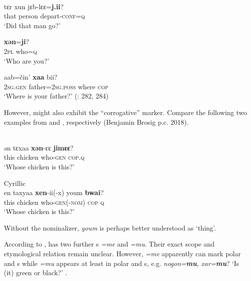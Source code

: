 \ea%
    \label{ex:mong:25}
     \\
    \ea
    \gll tɛr  xun  jɛb-lɛɛ=\textbf{{j.ii}}?\\
    that  person  depart-\textsc{conf}=\textsc{q}\\
    \glt ‘Did that man go?’ \citep[71]{Chaganhada1991}
    
    \ex
     \textbf{{xən}}{=}\textbf{{ji}}?\\
    2\textsc{pl}  who=\textsc{q}\\
    \glt ‘Who are you?’
    
    \ex
     {aab=čin’} \textbf{{xaa}} {bii}?\\
    2\textsc{sg.gen}  father=2\textsc{sg.poss}  where  \textsc{cop}\\
    \glt ‘Where is your father?’ (\citealt{Yamakoshi2015}: 282, 284)
    \z
    \z 

However,  might also exhibit the “corrogative” marker. Compare the following two examples from  and , respectively (Benjamin Brosig p.c. 2018).

\ea%
    \label{ex:mong:26}
     \\
    \gll ən  tɛxaa \textbf{{xən}}{-ɛɛ} \textbf{{jimɛɛ}}?\\
    this  chicken  who-\textsc{gen}  \textsc{cop.q}\\
    \glt ‘Whose chicken is this?’ \citep[71]{Chaganhada1991}
    \z

\ea%
    \label{ex:mong:27}
    Cyrillic  \\
    \gll en  taxyaa \textbf{{xen}}-ii(-x)    youm \textbf{{bwai}}?\\
    this  chicken  who-\textsc{gen}(-\textsc{nom})  \textsc{cop}  \textsc{q}\\
    \glt ‘Whose chicken is this?’
    \z

\noindent Without the nominalizer, \textit{youm} is perhaps better understood as ‘thing’.

According to \citet[15]{Brosig2014},  has two further s \textit{=me} and \textit{=mu}. Their exact scope and etymological relation remain unclear. However, \textit{=me} apparently can mark polar and s while \textit{=mu} appears at least in polar and s, e.g. \textit{nogon=}\textbf{\textit{mu}}\textit{, xar=}\textbf{\textit{mu}}? ‘Is (it) green or black?’ \citep[15]{Brosig2014}.

